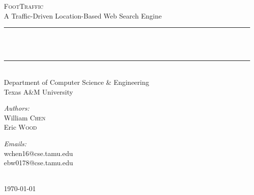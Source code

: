 \newcommand{\HRule}{\rule{\linewidth}{0.5mm}}
%
%
\begin{titlepage}
  \begin{center}
  \textsc{\Large FootTraffic}\\[0.2cm]
  \large {A Traffic-Driven Location-Based Web Search Engine}\\[0.5cm]
  \HRule \\[0.4cm]
  {\huge \bfseries \PaperTitle}\\[0.2cm]
  \HRule \\[1cm]
  
  \large{Department of Computer Science \& Engineering} \\
  \large{Texas A\&M University} \\[1cm]

  \begin{minipage}{0.4\textwidth}
    \begin{flushleft} \large
    \emph{Authors:}\\
    William \textsc{Chen} \\
    Eric \textsc{Wood}
    \end{flushleft}
  \end{minipage}
  \begin{minipage}{0.4\textwidth}
    \begin{flushright} \large
    \emph{Emails:} \\
    wchen16@cse.tamu.edu\\
    ebw0178@cse.tamu.edu
    \end{flushright}
  \end{minipage}
  \\[1cm]
  \large{\today}
  \vfill
  
  \end{center}
\end{titlepage}
